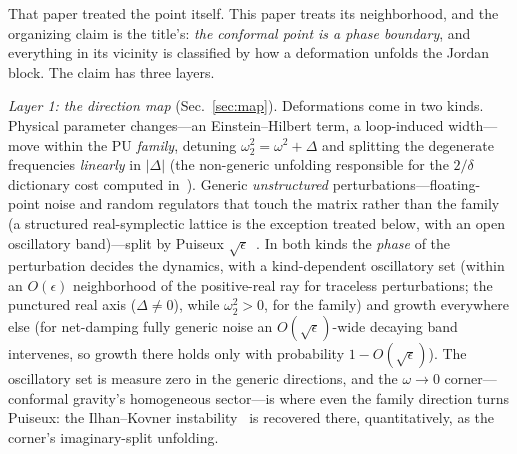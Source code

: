 ﻿\documentclass[11pt]{article}
\theoremstyle{remark}
\begin{document}
That paper treated the point itself. This paper treats its
neighborhood, and the organizing claim is the title's: \emph{the
conformal point is a phase boundary}, and everything in its vicinity
is classified by how a deformation unfolds the Jordan block. The
claim has three layers.

\emph{Layer 1: the direction map} (Sec.~\ref{sec:map}). Deformations
come in two kinds. Physical parameter changes---an Einstein--Hilbert
term, a loop-induced width---move within the PU \emph{family},
detuning $\omega_2^2=\omega^2+\Delta$ and splitting the degenerate
frequencies \emph{linearly} in $|\Delta|$ (the non-generic unfolding
responsible for the $2/\delta$ dictionary cost computed
in~\cite{choosing}). Generic \emph{unstructured} perturbations---floating-point
noise and random regulators that touch
the matrix rather than the family (a structured real-symplectic lattice
is the exception treated below, with an open oscillatory band)---split by Puiseux
$\sqrt\epsilon$~\cite{Kato}. In both kinds the \emph{phase} of the
perturbation decides the dynamics, with a kind-dependent
oscillatory set (within an $O(\epsilon)$ neighborhood of the positive-real ray for traceless perturbations;
the punctured real axis ($\Delta\neq0$), while $\omega_2^2>0$, for the family)
and growth everywhere else (for net-damping fully generic noise an $O(\sqrt\epsilon)$-wide decaying band intervenes, so growth there holds only with probability $1-O(\sqrt\epsilon)$). The oscillatory set is measure zero in
the generic directions, and the $\omega\to0$ corner---conformal
gravity's homogeneous sector---is where even the family direction
turns Puiseux: the Ilhan--Kovner instability~\cite{IK2014} is
recovered there, quantitatively, as the corner's imaginary-split
unfolding.
\end{document}
